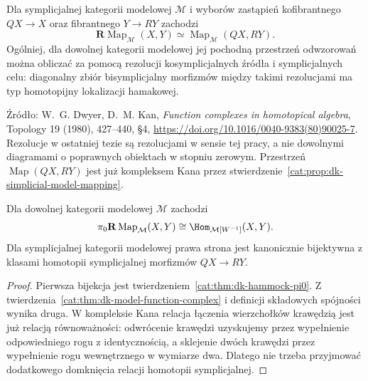 \begin{twierdzenie}\label{cat:thm:dk-model-function-complex}
Dla symplicjalnej kategorii modelowej $\mathcal M$ i wyborów zastąpień kofibrantnego $QX\to X$ oraz fibrantnego $Y\to RY$ zachodzi
\[
 \mathbf R\operatorname{Map}_{\mathcal M}(X,Y)
 \simeq\operatorname{Map}_{\mathcal M}(QX,RY).
\]
Ogólniej, dla dowolnej kategorii modelowej jej pochodną przestrzeń odwzorowań można obliczać za pomocą rezolucji kosymplicjalnych źródła i symplicjalnych celu: diagonalny zbiór bisymplicjalny morfizmów między takimi rezolucjami ma typ homotopijny lokalizacji hamakowej.
\end{twierdzenie}

Źródło: W.~G. Dwyer, D.~M. Kan, \emph{Function complexes in homotopical algebra}, Topology 19 (1980), 427--440, \S4, \url{https://doi.org/10.1016/0040-9383(80)90025-7}. Rezolucje w ostatniej tezie są rezolucjami w sensie tej pracy, a nie dowolnymi diagramami o poprawnych obiektach w stopniu zerowym. Przestrzeń $\operatorname{Map}(QX,RY)$ jest już kompleksem Kana przez stwierdzenie~\ref{cat:prop:dk-simplicial-model-mapping}.

\begin{wniosek}\label{cat:cor:dk-model-pi0}
Dla dowolnej kategorii modelowej $\mathcal M$ zachodzi
\[
 \pi_0\mathbf R\operatorname{Map}_{\mathcal M}(X,Y)
 \cong\Hom_{\mathcal M[W^{-1}]}(X,Y).
\]
Dla symplicjalnej kategorii modelowej prawa strona jest kanonicznie bijektywna z klasami homotopii symplicjalnej morfizmów $QX\to RY$.
\end{wniosek}
\begin{proof}
Pierwsza bijekcja jest twierdzeniem~\ref{cat:thm:dk-hammock-pi0}. Z twierdzenia~\ref{cat:thm:dk-model-function-complex} i definicji składowych spójności wynika druga. W kompleksie Kana relacja łączenia wierzchołków krawędzią jest już relacją równoważności: odwrócenie krawędzi uzyskujemy przez wypełnienie odpowiedniego rogu z identycznością, a sklejenie dwóch krawędzi przez wypełnienie rogu wewnętrznego w wymiarze dwa. Dlatego nie trzeba przyjmować dodatkowego domknięcia relacji homotopii symplicjalnej.
\end{proof}

